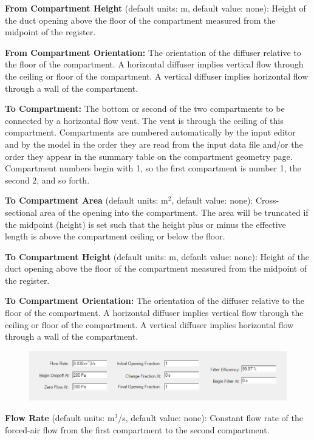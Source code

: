 \textbf{From Compartment Height} (default units: m, default value: none): Height of the duct opening above the floor of the compartment measured from the midpoint of the register.

\textbf{From Compartment Orientation:} The orientation of the diffuser relative to the floor of the compartment.  A horizontal diffuser implies vertical flow through the ceiling or floor of the compartment.  A vertical diffuser implies horizontal flow through a wall of the compartment.

\textbf{To Compartment:} The bottom or second of the two compartments to be connected by a horizontal flow vent. The vent is through the ceiling of this compartment. Compartments are numbered automatically by the input editor and by the model in the order they are read from the input data file and/or the order they appear in the summary table on the compartment geometry page. Compartment numbers begin with 1, so the first compartment is number 1, the second 2, and so forth.

\textbf{To Compartment Area} (default units: m$^2$, default value: none): Cross-sectional area of the opening into the compartment. The area will be truncated if the midpoint (height) is set such that the height plus or minus the effective length is above the compartment ceiling or below the floor.

\textbf{To Compartment Height} (default units: m, default value: none): Height of the duct opening above the floor of the compartment measured from the midpoint of the register.

\textbf{To Compartment Orientation:} The orientation of the diffuser relative to the floor of the compartment.  A horizontal diffuser implies vertical flow through the ceiling or floor of the compartment.  A vertical diffuser implies horizontal flow through a wall of the compartment.

\begin{figure}[h!]
\begin{center}
\includegraphics[width=4.487in]{FIGURES/Input_File/Mechanical_Vent_Flowrate}
\end{center}
\end{figure}

\textbf{Flow Rate} (default units: m$^3$/s, default value: none): Constant flow rate of the forced-air flow from the first compartment to the second compartment.

